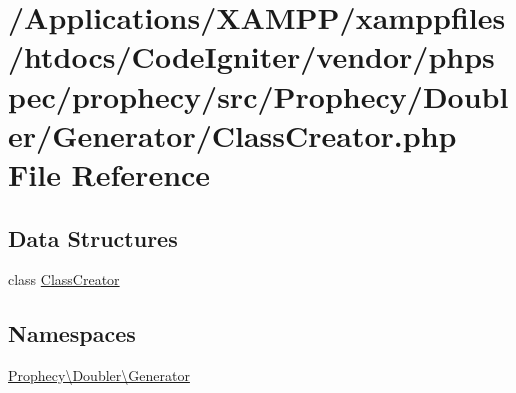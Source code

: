 \hypertarget{_class_creator_8php}{}\section{/\+Applications/\+X\+A\+M\+P\+P/xamppfiles/htdocs/\+Code\+Igniter/vendor/phpspec/prophecy/src/\+Prophecy/\+Doubler/\+Generator/\+Class\+Creator.php File Reference}
\label{_class_creator_8php}
\subsection*{Data Structures}
\begin{DoxyCompactItemize}
\item 
class \mbox{\hyperlink{class_prophecy_1_1_doubler_1_1_generator_1_1_class_creator}{Class\+Creator}}
\end{DoxyCompactItemize}
\subsection*{Namespaces}
\begin{DoxyCompactItemize}
\item 
 \mbox{\hyperlink{namespace_prophecy_1_1_doubler_1_1_generator}{Prophecy\textbackslash{}\+Doubler\textbackslash{}\+Generator}}
\end{DoxyCompactItemize}

